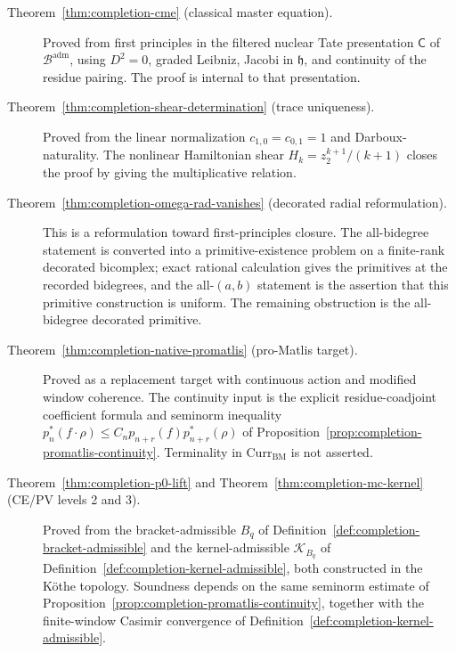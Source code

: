 \begin{description}
\item[Theorem~\ref{thm:completion-cme} (classical master equation).]
  Proved from first principles in the filtered nuclear Tate presentation
  \(\mathsf C\) of \(\mathcal B^{\mathrm{adm}}\), using \(D^2=0\),
  graded Leibniz, Jacobi in
  \(\mathfrak h\), and continuity of the residue pairing.  The proof is
  internal to that presentation.

\item[Theorem~\ref{thm:completion-shear-determination} (trace
  uniqueness).]  Proved from the linear normalization
  \(c_{1,0}=c_{0,1}=1\) and Darboux-naturality.  The
  nonlinear Hamiltonian shear \(H_k=z_2^{k+1}/(k+1)\) closes the
  proof by giving the multiplicative relation.

\item[Theorem~\ref{thm:completion-omega-rad-vanishes} (decorated
  radial reformulation).]  This is a reformulation toward
  first-principles closure.  The all-bidegree statement is
  converted into a primitive-existence problem on a finite-rank
  decorated bicomplex; exact rational calculation gives the primitives
  at the recorded bidegrees, and the all-\((a,b)\) statement is the
  assertion that this primitive construction is uniform.  The remaining
  obstruction is the
  all-bidegree decorated primitive.

\item[Theorem~\ref{thm:completion-native-promatlis} (pro-Matlis
  target).]  Proved as a replacement target with continuous action
  and modified window coherence.  The continuity input is the explicit
  residue-coadjoint coefficient formula and seminorm inequality
  \(p^*_n(f\cdot\rho)\le
  C_n p_{n+r}(f)p^*_{n+r}(\rho)\) of
  Proposition~\ref{prop:completion-promatlis-continuity}.  Terminality
  in \(\mathrm{Curr}_{\mathrm{BM}}\) is not asserted.

\item[Theorem~\ref{thm:completion-p0-lift} and
  Theorem~\ref{thm:completion-mc-kernel} (CE/PV levels 2 and 3).]
  Proved from the bracket-admissible \(B_q\) of
  Definition~\ref{def:completion-bracket-admissible} and the
  kernel-admissible \(\mathcal K_{B_q}\) of
  Definition~\ref{def:completion-kernel-admissible}, both
  constructed in the K\"othe topology.  Soundness depends on the
  same seminorm estimate of
  Proposition~\ref{prop:completion-promatlis-continuity}, together with
  the finite-window Casimir convergence of
  Definition~\ref{def:completion-kernel-admissible}.


\end{description}
